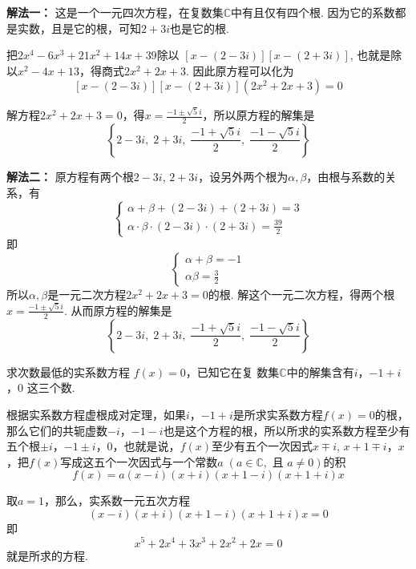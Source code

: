 \begin{solution}
\textbf{解法一：} 这是一个一元四次方程，在复数集$\mathbb{C}$中有且仅有四个根. 因为它的系数都是实数，且是它的根，可知$2+3i$也是它的根.

把$2x^4-6x^3+21x^2+14x+39$除以
$[x-(2-3i)][x-(2+3i)]$, 
也就是除以$x^2-4x+13$，得商式$2x^2+2x+3$. 因此原方程可以化为
\[[x-(2-3i)][x-(2+3i)](2x^2+2x+3)=0\]

解方程$2x^2+2x+3=0$，得$x=\frac{-1\pm\sqrt{5}i}{2}$，所以原方程的解集是
\[\left\{2-3i,\; 2+3i,\; \frac{-1+\sqrt{5}i}{2},\; \frac{-1-\sqrt{5}i}{2}\right\}\]

\textbf{解法二：} 原方程有两个根$2-3i$, $2+3i$，设另外两个根为$\alpha, \beta$，由根与系数的关系，有
\[\begin{cases}
    \alpha+\beta+(2-3i)+(2+3i)=3\\
    \alpha\cdot \beta\cdot (2-3i)\cdot (2+3i)=\frac{39}{2}
\end{cases}\]
即
\[\begin{cases}
    \alpha+\beta=-1 \\ \alpha\beta=\frac{3}{2}
\end{cases}\]
所以$\alpha,\beta$是一元二次方程$2x^2+2x+3=0$的根. 解这个一元二次方程，得两个根$x=\frac{-1\pm\sqrt{5}i}{2}$. 从而原方程的解集是
\[\left\{2-3i,\; 2+3i,\; \frac{-1+\sqrt{5}i}{2},\; \frac{-1-\sqrt{5}i}{2}\right\}\]
\end{solution}

\begin{example}
    求次数最低的实系数方程
$f(x)=0$，已知它在复
数集$\mathbb{C}$中的解集含有$i$，$-1+i$，0
这三个数.
\end{example}

\begin{solution}
    根据实系数方程虚根成对定理，如果$i$，$-1+i$是所求实系数方程$f(x)=0$的根，那么它们的共轭虚数$-i$，$-1-i$也是这个方程的根，所以所求的实系数方程至少有五个根$\pm i$，$-1\pm i$，0，也就是说，$f(x)$至少有五个一次因式$x\mp i$, $x+1\mp i$，$x$，把$f(x)$写成这五个一次因式与一个常数$a\; (a\in\mathbb{C}, \text{ 且 } a\ne 0)$的积
\[f(x)=a(x-i)(x+i)(x+1-i)(x+1+i)x\]

取$a=1$，那么，实系数一元五次方程
\[(x-i)(x+i)(x+1-i)(x+1+i)x=0\]
即
\[x^5+2x^4+3x^3+2x^2+2x=0\]
就是所求的方程.
\end{solution}

